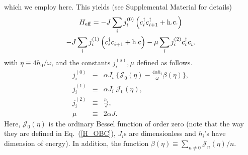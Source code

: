 \documentclass[reprint,preprintnumbers,showpacs,amsmath,twocolumn,showkeys,aps,prl]{revtex4-1}
\begin{document}
which we employ here. This yields (see Supplemental Material for details)
\begin{multline}
\label{eq:heff}
H_{\rm eff}    =   -J\sum_i j^{(0)}_i\left(c^\dagger_i c^\dagger_{i+1} + \rm{h.c.}\right) \\
		            -J\sum_i j^{(1)}_i\left(c^\dagger_i c^{\;}_{i+1}+\rm{h.c}\right) 
		            -\mu\sum_i j^{(2)}_i c^\dagger_i c^{\;}_i,
\end{multline}
with $\eta \equiv 4h_0/\omega$, and the constants $j^{(s)}_i, \mu $ defined as follows.
\begin{eqnarray}
j^{(0)}_i            &\equiv& \alpha J_i\; \bigg\{\mathcal{J}_0(\eta) - \frac{4\alpha h_i}{\omega}\beta(\eta)\bigg\} ,\nonumber \\
j^{(1)}_i            &\equiv& \alpha J_i \; \mathcal{J}_0(\eta) ,\nonumber \\
j^{(2)}_i            &\equiv& \frac{h_i}{J},\nonumber \\
\mu 		     &\equiv& 2\alpha J.
\label{Renorm_fctr}
\end{eqnarray}
Here, $\mathcal{J}_0(\eta)$ is the ordinary Bessel function of order zero
(note that the way they are defined in Eq.~(\ref{H_OBC}), $J_{i}$s are 
dimensionless and $h_{i}$'s have dimension of energy). In addition, the function $\beta(\eta)\equiv\sum_{n\neq 0} {\mathcal{J}_n(\eta)}/{n}$. 
\end{document}
